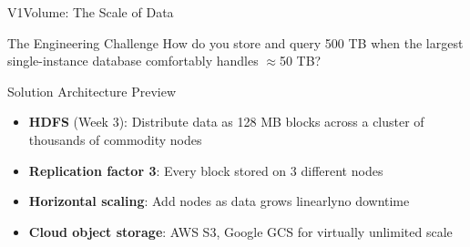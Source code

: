 \documentclass[aspectratio=169,10pt]{beamer}
\begin{document}
\begin{frame}{V1\textemdash Volume: The Scale of Data}

      \begin{alertblock}{The Engineering Challenge}
        How do you store and query 500 TB when the largest single-instance database comfortably handles $\approx$50 TB?
      \end{alertblock}
      \vspace{6pt}
      \begin{block}{Solution Architecture Preview}
        \begin{itemize}
          \small
          \item \textbf{HDFS} (Week 3): Distribute data as 128 MB blocks across a cluster of thousands of commodity nodes
          \item \textbf{Replication factor 3}: Every block stored on 3 different nodes
          \item \textbf{Horizontal scaling}: Add nodes as data grows linearly\textemdash no downtime
          \item \textbf{Cloud object storage}: AWS S3, Google GCS for virtually unlimited scale
        \end{itemize}
      \end{block}
\end{frame}
\end{document}

